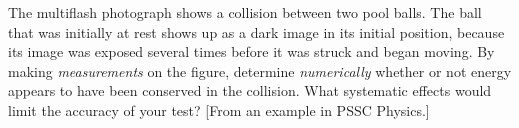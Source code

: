 
The multiflash photograph shows a collision
between two pool balls. The ball that was initially at rest
shows up as a dark image in its initial position, because
its image was exposed several times before it was struck and
began moving. By making \emph{measurements} on the figure,
determine \emph{numerically} whether or not energy appears to have been
conserved in the collision. What systematic effects would
limit the accuracy of your test? [From an example in PSSC Physics.]
